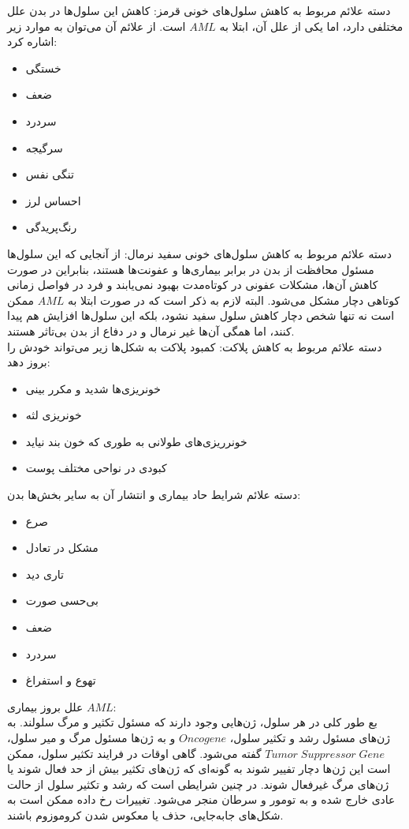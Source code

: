 \documentclass[a4paper,12pt]{article}
\begin{document}
دسته علائم مربوط به کاهش سلول‌های خونی قرمز: کاهش این سلول‌ها در بدن علل مختلفی دارد، اما یکی از علل آن، ابتلا به $AML$ است. از علائم آن می‌توان به موارد زیر اشاره کرد:
\begin{itemize}
\item خستگی
\item ضعف
\item سردرد
\item سرگیجه
\item تنگی نفس
\item احساس لرز
\item رنگ‌پریدگی
\end{itemize}
دسته علائم مربوط به کاهش سلول‌های خونی سفید نرمال: از آنجایی که این سلول‌ها مسئول محافظت از بدن در برابر بیماری‌ها و عفونت‌ها هستند، بنابراین در صورت کاهش آن‌ها، مشکلات عفونی در کوتاه‌مدت بهبود نمی‌یابند و فرد در فواصل زمانی کوتاهی دچار مشکل می‌شود. البته لازم به ذکر است که در صورت ابتلا به $AML$ ممکن است نه تنها شخص دچار کاهش سلول سفید نشود، بلکه این سلول‌ها افزایش هم پیدا کنند، اما همگی آن‌ها غیر نرمال و در دفاع از بدن بی‌تاثر هستند.\\
دسته علائم مربوط به کاهش پلاکت: کمبود پلاکت به شکل‌ها زیر می‌تواند خودش را بروز دهد:
\begin{itemize}
\item خونریزی‌ها شدید و مکرر بینی
\item خونریزی لثه
\item خونرریزی‌های طولانی به طوری که خون بند نیاید
\item کبودی در نواحی مختلف پوست
\end{itemize}
دسته علائم شرایط حاد بیماری و انتشار آن به سایر بخش‌ها بدن:
\begin{itemize}
\item صرع
\item مشکل در تعادل
\item تاری دید
\item بی‌حسی صورت
\item ضعف
\item سردرد
\item تهوع و استفراغ
\end{itemize}
علل بروز بیماری $AML$:\\
بع طور کلی در هر سلول، ژن‌هایی وجود دارند که مسئول تکثیر و مرگ سلولند. به ژن‌های مسئول رشد و تکثیر سلول، $Oncogene$ و به ژن‌ها مسئول مرگ و میر سلول،
$Tumor\; Suppressor\; Gene$
گفته می‌شود. گاهی اوقات در فرایند تکثیر سلول، ممکن است این ژن‌ها دچار تفییر شوند به گونه‌ای که ژن‌های تکثیر بیش از حد فعال شوند یا ژن‌های مرگ غیرفعال شوند. در چنین شرایطی است که رشد و تکثیر سلول از حالت عادی خارج شده و به تومور و سرطان منجر می‌شود. تغییرات رخ داده ممکن است به شکل‌های جابه‌جایی، حذف یا معکوس شدن کروموزوم باشند.\\
\end{document}
